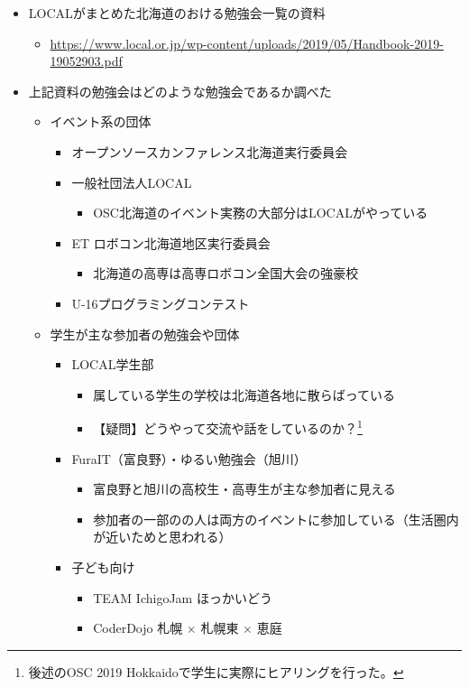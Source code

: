 \documentclass[mingoth,a4paper]{jsarticle}
\begin{document}
  
\begin{itemize}
\item  LOCALがまとめた北海道のおける勉強会一覧の資料
  \begin{itemize}
  \item \url{https://www.local.or.jp/wp-content/uploads/2019/05/Handbook-2019-19052903.pdf}
  \end{itemize}
\item 上記資料の勉強会はどのような勉強会であるか調べた
  \begin{itemize}
  \item イベント系の団体
    \begin{itemize}
    \item オープンソースカンファレンス北海道実行委員会
    \item 一般社団法人LOCAL
      \begin{itemize}
      \item OSC北海道のイベント実務の大部分はLOCALがやっている
      \end{itemize}
    \item ET ロボコン北海道地区実行委員会
      \begin{itemize}
      \item 北海道の高専は高専ロボコン全国大会の強豪校
      \end{itemize}
    \item U-16プログラミングコンテスト
    \end{itemize}
  \item 学生が主な参加者の勉強会や団体
    \begin{itemize}
    \item LOCAL学生部
      \begin{itemize}
      \item 属している学生の学校は北海道各地に散らばっている
      \item 【疑問】どうやって交流や話をしているのか？\footnote{後述のOSC 2019 Hokkaidoで学生に実際にヒアリングを行った。}
      \end{itemize}
    \item FuraIT（富良野）・ゆるい勉強会（旭川）
      \begin{itemize}
      \item 富良野と旭川の高校生・高専生が主な参加者に見える
      \item 参加者の一部のの人は両方のイベントに参加している（生活圏内が近いためと思われる）
      \end{itemize}
    \item 子ども向け
      \begin{itemize}
      \item TEAM IchigoJam ほっかいどう
      \item CoderDojo 札幌 × 札幌東 × 恵庭
      \end{itemize}
    \end{itemize}
  \end{itemize}
\end{itemize}
\end{document}
